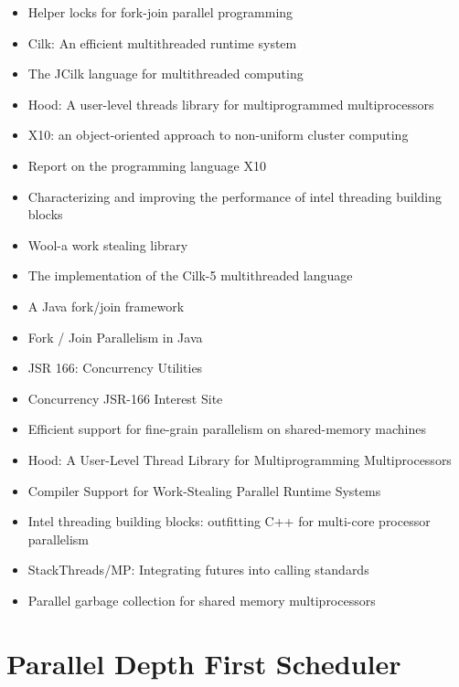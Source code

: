\begin{itemize}
\item Helper locks for fork-join parallel programming
  \cite{Agrawal2010}
\item[\checkmark] Cilk: An efficient multithreaded runtime system
  \cite{Blumofe1995}
\item[\checkmark] The JCilk language for multithreaded computing
  \cite{Danaher2005}
\item Hood: A user-level threads library for multiprogrammed
  multiprocessors \cite{Blumofe1998}
\item X10: an object-oriented approach to non-uniform cluster
  computing \cite{Charles2005}
\item Report on the programming language X10 \cite{Saraswat2010}
\item[\checkmark] Characterizing and improving the performance of
  intel threading building blocks \cite{Contreras2008}
\item[\texttimes] Wool-a work stealing library \cite{Faxen2009}
\item[\checkmark] The implementation of the Cilk-5 multithreaded
  language \cite{Frigo1998}
\item[\checkmark] A Java fork/join framework \cite{Lea2000}
\item[\checkmark] Fork / Join Parallelism in Java \cite{Lea2000a}
\item[\checkmark] JSR 166: Concurrency Utilities \cite{Lea2004}
\item[\checkmark] Concurrency JSR-166 Interest Site \cite{Lea2006}
\item Efficient support for fine-grain parallelism on shared-memory
  machines \cite{Lowenthal1998}
\item Hood: A User-Level Thread Library for Multiprogramming
  Multiprocessors \cite{Papadopoulos1998}
\item Compiler Support for Work-Stealing Parallel Runtime Systems
  \cite{Raman2009}
\item[\checkmark] Intel threading building blocks: outfitting C++ for
  multi-core processor parallelism \cite{Reinders2007}
\item StackThreads/MP: Integrating futures into calling standards
  \cite{Taura1999}
\item Parallel garbage collection for shared memory multiprocessors
  \cite{Flood2001}
\end{itemize}


\section*{Parallel Depth First Scheduler}
\label{sec:lr-parallel-depth-first-scheduler}

